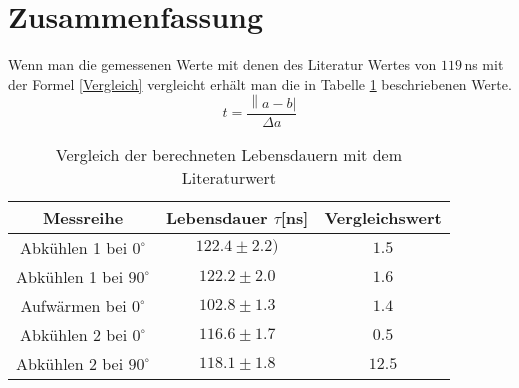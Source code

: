 \section{Zusammenfassung}
Wenn man die gemessenen Werte mit denen des Literatur Wertes von $119\,$ns mit der Formel \ref{Vergleich} vergleicht erhält man die in Tabelle \ref{VglTable} beschriebenen Werte. \\
\begin{equation}
t=\frac{\left\|a-b\right|}{\Delta a}
\label{Vergleich}
\end{equation}



\begin{center}
	\begin{table}[h]
		\centering
		\begin{tabular}{|c|c|c|}
			\hline
			Messreihe&Lebensdauer $\tau$[ns]&Vergleichswert\\
			\hline
			Abkühlen 1 bei $0^\circ$&$122.4\pm2.2)$&$1.5$\\
			\hline
			Abkühlen 1 bei $90^\circ$&$122.2\pm2.0$&$1.6$\\
			\hline
			Aufwärmen bei $0^\circ$&$102.8\pm1.3$&$1.4$\\
			\hline
			Abkühlen 2 bei $0^\circ$&$116.6\pm1.7$&$0.5$\\
			\hline
			Abkühlen 2 bei $90^\circ$&$118.1\pm1.8$&$12.5$\\
			\hline
		\end{tabular}
	\caption[Endergebnisse]{Vergleich der berechneten Lebensdauern mit dem Literaturwert}
	\label{VglTable}
	\end{table}
\end{center}




